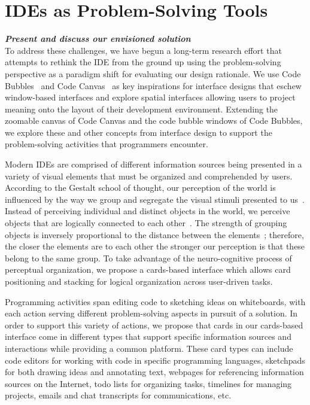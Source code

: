 \documentclass{ppig}
\newcommand{\bold}[1]{\textit{\textbf{\color{aoblue}#1}}} %
\begin{document}
\section{IDEs as Problem-Solving Tools}
\bold{Present and discuss our envisioned solution\\}
To address these challenges, we have begun a long-term research effort that attempts to rethink the IDE from the ground up using the problem-solving perspective as a paradigm shift for evaluating our design rationale.
We use Code Bubbles~\cite{bragdon2010bubbles} and Code Canvas~\cite{deline2010canvas} as key inspirations for interface designs that eschew window-based interfaces and explore spatial interfaces allowing users to project meaning onto the layout of their development environment.
Extending the zoomable canvas of Code Canvas and the code bubble windows of Code Bubbles, we explore these and other concepts from interface design to support the problem-solving activities that programmers encounter.

Modern IDEs are comprised of different information sources being presented in a variety of visual elements that must be organized and comprehended by users.
According to the Gestalt school of thought, our perception of the world is influenced by the way we group and segregate the visual stimuli presented to us~\cite{kimchi2003perceptual}.
Instead of perceiving individual and distinct objects in the world, we perceive objects that are logically connected to each other~\cite{kimchi2003perceptual}.
The strength of grouping objects is inversely proportional to the distance between the elements~\cite{bergman2009peirce}; therefore, the closer the elements are to each other the stronger our perception is that these belong to the same group.
To take advantage of the neuro-cognitive process of perceptual organization, we propose a cards-based interface which allows card positioning and stacking for logical organization across user-driven tasks.

Programming activities span editing code to sketching ideas on whiteboards, with each action serving different problem-solving aspects in pursuit of a solution.
In order to support this variety of actions, we propose that cards in our cards-based interface come in different types that support specific information sources and interactions while providing a common platform.
These card types can include code editors for working with code in specific programming languages, sketchpads for both drawing ideas and annotating text, webpages for referencing information sources on the Internet, todo lists for organizing tasks, timelines for managing projects, emails and chat transcripts for communications, etc.
\end{document}
